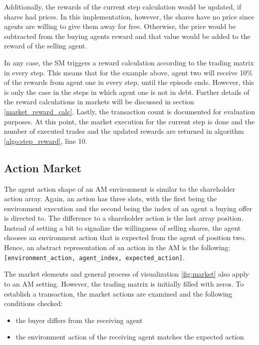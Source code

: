 Additionally, the rewards of the current step calculation would be updated, if shares had prices. In this implementation, however, the shares have no price since agents are willing to give them away for free. Otherwise, the price would be subtracted from the buying agents reward and that value would be added to the reward of the selling agent. 

In any case, the SM triggers a reward calculation according to the trading matrix in every step. This means that for the example above, agent two will receive 10\% of the rewards from agent one in every step, until the episode ends. However, this is only the case in the steps in which agent one is not in debt. Further details of the reward calculations in markets will be discussed in section \ref{market_reward_calc}. Lastly, the transaction count is documented for evaluation purposes. At this point, the market execution for the current step is done and the number of executed trades and the updated rewards are returned in algorithm \ref{algo:step_reward}, line 10.

\subsection{Action Market}
The agent action shape of an AM environment is similar to the shareholder action array. Again, an action has three slots, with the first being the environment execution and the second being the index of an agent a buying offer is directed to. The difference to a shareholder action is the last array position. Instead of setting a bit to signalize the willingness of selling shares, the agent chooses an environment action that is expected from the agent of position two. Hence, an abstract representation of an action in the AM is the following: \verb|[environment_action, agent_index, expected_action]|.

The market elements and general process of visualization \ref{fig:market} also apply to an AM setting. However, the trading matrix is initially filled with zeros. To establish a transaction, the market actions are examined and the following conditions checked:
\begin{itemize}
    \item the buyer differs from the receiving agent
    \item the environment action of the receiving agent matches the expected action
\end{itemize}

